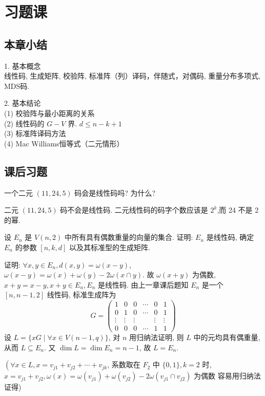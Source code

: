 \section{习题课}

\subsection{本章小结}
1. 基本概念\\
线性码, 生成矩阵, 校验阵, 标准阵（列）译码，伴随式，对偶码, 重量分布多项式, MDS码.

2. 基本结论\\
(1) 校验阵与最小距离的关系\\
(2) 线性码的 $ G-V $ 界. $ d \leq n-k+1 $\\
(3) 标准阵译码方法\\
(4) Mac Williams恒等式（二元情形）

\subsection{课后习题}
\begin{exercise}
    一个二元 $ (11,24,5) $ 码会是线性码吗? 为什么?
\end{exercise}
\begin{solution}
    二元 $ (11,24,5) $ 码不会是线性码. 二元线性码的码字个数应该是 $ 2^{k} $,而 24 不是 2 的幂.
\end{solution}


\begin{exercise}
 设 $ E_{n} $ 是 $ V(n, 2) $ 中所有具有偶数重量的向量的集合. 证明: $ E_{n} $ 是线性码, 确定 $ E_{n} $ 的参数 $ [n, k, d] $ 以及其标准型的生成矩阵.
\end{exercise}
\begin{solution}
    证明: $ \forall x, y \in E_{n}, d(x, y)=\omega(x-y) $,
$ \omega(x-y)=\omega(x)+\omega(y)-2 \omega(x \cap y) $. 故 $ \omega(x+y) $ 为偶数, $ x+y=x-y, x+y \in E_{n}, E_{n} $ 是线性码.
由上一章课后题知 $ E_{n} $ 是一个 $ [n, n-1,2] $ 线性码, 标准生成阵为
$$
G=\left(\begin{array}{cccccc}
1 & 0 & 0 & \cdots & 0 & 1 \\
0 & 1 & 0 & \cdots & 0 & 1 \\
\vdots & \vdots & \vdots & & \vdots & \vdots \\
0 & 0 & 0 & \cdots & 1 & 1
\end{array}\right)
$$
设 $ L=\{x G \mid \forall x \in V(n-1, q)\} $, 对 $ n $ 用归纳法证明, 则 $ L $ 中的元均具有偶重量, 从而 $ L \subseteq E_{n} $.
又 $ \operatorname{dim} L=\operatorname{dim} E_{n}=n-1 $, 故 $ L=E_{n} $.

$ \left(\forall x \in L, x=v_{j 1}+v_{j 2}+\cdots+v_{j k}\right. $, 系数取在 $ F_{2} $ 中 $ \{0,1\}, k= 2$ 时, $ x=v_{j 1}+v_{j 2}, \omega(x)=\omega\left(v_{j 1}\right)+\omega\left(v_{j 2}\right)-2 \omega\left(v_{j 1} \cap v_{j 2}\right) $ 为偶数
容易用归纳法证得)
\end{solution}



